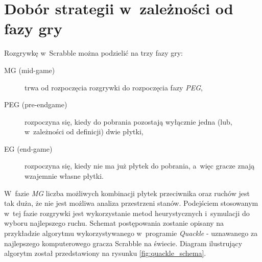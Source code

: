 \documentclass[a4paper,twocolumn,12pt]{article}
\begin{document}
\section*{Dobór strategii w~zależności od fazy gry}

Rozgrywkę w~Scrabble można podzielić na trzy fazy gry:

\begin{description}
 \item [MG (mid-game)] trwa od rozpoczęcia rozgrywki do rozpoczęcia fazy \emph{PEG},
 \item [PEG (pre-endgame)] rozpoczyna się, kiedy do pobrania pozostają wyłącznie jedna (lub, w~zależności od definicji) dwie płytki,
 \item [EG (end-game)] rozpoczyna się, kiedy nie ma już płytek do pobrania, a~więc gracze znają wzajemnie własne płytki.
\end{description}

W~fazie \emph{MG} liczba możliwych kombinacji płytek przeciwnika oraz ruchów jest tak duża, że nie jest możliwa analiza przestrzeni stanów. Podejściem stosowanym w~tej fazie rozgrywki jest wykorzystanie metod heurystycznych i~symulacji do wyboru najlepszego ruchu. Schemat postępowania zostanie opisany na przykładzie algorytmu wykorzystywanego w~programie \emph{Quackle} - uznawanego za najlepszego komputerowego gracza Scrabble na świecie. \cite{quackle_algorithm} Diagram ilustrujący algorytm został przedstawiony na rysunku \ref{fig:quackle_schema}.
\end{document}
